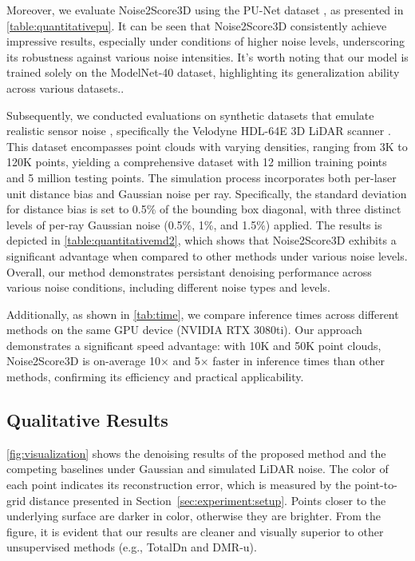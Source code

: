 Moreover, we evaluate Noise2Score3D using the PU-Net dataset \cite{yu2018PUNet}, as presented in \cref{table:quantitativepu}.  It can be seen that Noise2Score3D consistently achieve impressive results, especially under conditions of higher noise levels, underscoring its robustness against various noise intensities. It’s worth noting that our model is trained solely on the ModelNet-40 dataset, highlighting its generalization ability across various datasets..

Subsequently, we conducted evaluations on synthetic datasets that emulate realistic sensor noise \cite{hermosilla2019TotalDenoising}, specifically the Velodyne HDL-64E 3D LiDAR scanner \cite{gschwandtner2011blensor}. This dataset encompasses point clouds with varying densities, ranging from 3K to 120K points, yielding a comprehensive dataset with 12 million training points and 5 million testing points. The simulation process incorporates both per-laser unit distance bias and Gaussian noise per ray. Specifically, the standard deviation for distance bias is set to 0.5\% of the bounding box diagonal, with three distinct levels of per-ray Gaussian noise (0.5\%, 1\%, and 1.5\%) applied. The results is depicted in \cref{table:quantitativemd2}, which shows that Noise2Score3D exhibits a significant advantage when compared to other methods under various noise levels. Overall, our method demonstrates persistant denoising performance across various noise conditions, including different noise types and levels. 

Additionally, as shown in \cref{tab:time}, we compare inference times across different methods on the same GPU device (NVIDIA RTX 3080ti). Our approach demonstrates a significant speed advantage: with 10K and 50K point clouds, Noise2Score3D is on-average 10$\times$ and 5$\times$ faster in inference times than other methods, confirming its efficiency and practical applicability.

\subsection{Qualitative Results}
\label{sec:experiment:qualitative}
\cref{fig:visualization} shows the denoising results of the proposed method and the competing baselines under Gaussian and simulated LiDAR noise. The color of each point indicates its reconstruction error, which is measured by the point-to-grid distance presented in Section~\ref{sec:experiment:setup}. Points closer to the underlying surface are darker in color, otherwise they are brighter. From the figure, it is evident that our results are cleaner and visually superior to other unsupervised methods (e.g., TotalDn and DMR-u). 

